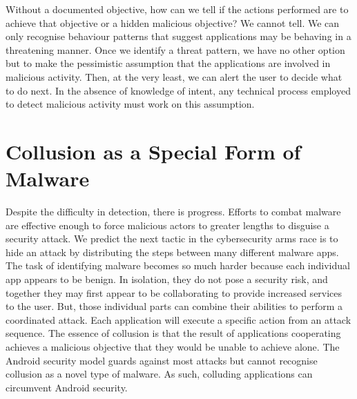 Without a documented objective, how can we tell if the actions performed are to achieve that objective or a hidden malicious objective?  We cannot tell.  We can only recognise behaviour patterns that suggest applications may be behaving in a threatening manner.  Once we identify a threat pattern, we have no other option but to make the pessimistic assumption that the applications are involved in malicious activity.  Then, at the very least, we can alert the user to decide what to do next.  In the absence of knowledge of intent, any technical process employed to detect malicious activity must work on this assumption.

\section{Collusion as a Special Form of Malware}

Despite the difficulty in detection, there is progress.  Efforts to combat malware are effective enough to force malicious actors to greater lengths to disguise a security attack.  We predict the next tactic in the cybersecurity arms race is to hide an attack by distributing the steps between many different malware apps.  The task of identifying malware becomes so much harder because each individual app appears to be benign.  In isolation, they do not pose a security risk, and together they may first appear to be collaborating to provide increased services to the user.  But, those individual parts can combine their abilities to perform a coordinated attack.  Each application will execute a specific action from an attack sequence.  The essence of collusion is that the result of applications cooperating achieves a malicious objective that they would be unable to achieve alone.  The Android security model guards against most attacks but cannot recognise collusion as a novel type of malware.  As such, colluding applications can circumvent Android security.

